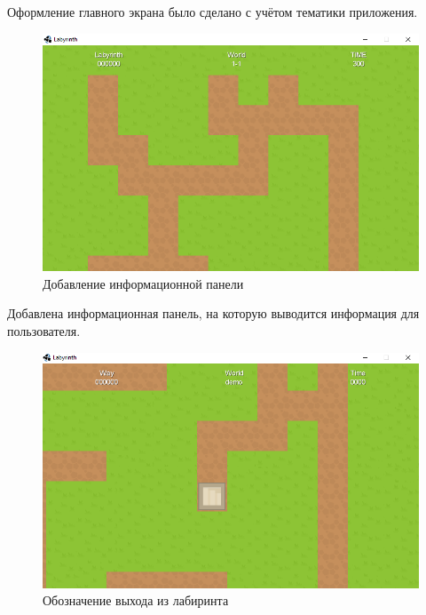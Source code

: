 Оформление главного экрана было сделано с учётом тематики приложения.

\begin{figure}[H]
	\begin{center}
		\includegraphics[scale=0.7]{pics/06.png}
		\caption{Добавление информационной панели} 
		\label{pic:pic_name} %
	\end{center}
\end{figure}

Добавлена информационная панель, на которую выводится информация для пользователя.

\begin{figure}[H]
	\begin{center}
		\includegraphics[scale=0.7]{pics/08.png}
		\caption{Обозначение выхода из лабиринта} 
		\label{pic:pic_name} %
	\end{center}
\end{figure}

